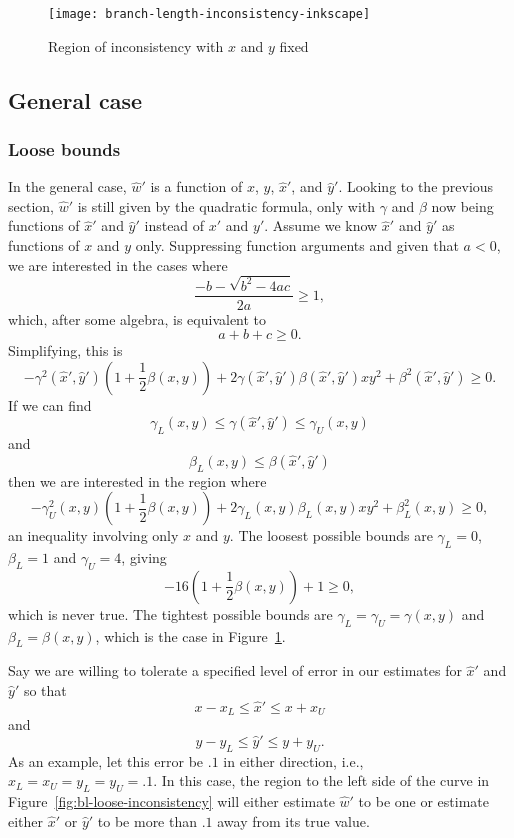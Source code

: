 \begin{figure}
\centering
\texttt{[image: branch-length-inconsistency-inkscape]}
\caption{Region of inconsistency with $x$ and $y$ fixed}
\label{fig:bl-inconsistency}
\end{figure}

\subsection{General case}

\subsubsection{Loose bounds}

In the general case, $\hat{w}'$ is a function of $x$, $y$, $\hat{x}'$, and $\hat{y}'$.
Looking to the previous section, $\hat{w}'$ is still given by the quadratic formula, only with $\gamma$ and $\beta$ now being functions of $\hat{x}'$ and $\hat{y}'$ instead of $x'$ and $y'$.
Assume we know $\hat{x}'$ and $\hat{y}'$ as functions of $x$ and $y$ only.
Suppressing function arguments and given that $a < 0$, we are interested in the cases where
$$
\frac{-b - \sqrt{b^2 - 4ac}}{2a} \ge 1,
$$
which, after some algebra, is equivalent to
$$
a + b + c \ge 0.
$$
Simplifying, this is
$$
-\gamma^2(\hat{x}', \hat{y}')(1 + \frac{1}{2}\beta(x, y)) + 2\gamma(\hat{x}', \hat{y}')\beta(\hat{x}', \hat{y}')xy^2 + \beta^2(\hat{x}', \hat{y}') \ge 0.
$$
If we can find
$$
\gamma_{L}(x, y) \le \gamma(\hat{x}', \hat{y}') \le \gamma_{U}(x, y)
$$
and
$$
\beta_{L}(x, y) \le \beta(\hat{x}', \hat{y}')
$$
then we are interested in the region where
$$
-\gamma_{U}^2(x, y)(1 + \frac{1}{2}\beta(x, y)) + 2\gamma_{L}(x, y)\beta_{L}(x, y)xy^2 + \beta_{L}^2(x, y) \ge 0,
$$
an inequality involving only $x$ and $y$.
The loosest possible bounds are $\gamma_{L} = 0$, $\beta_{L} = 1$ and $\gamma_{U} = 4$, giving
$$
-16(1 + \frac{1}{2}\beta(x, y)) + 1 \ge 0,
$$
which is never true.
The tightest possible bounds are $\gamma_{L} = \gamma_{U} = \gamma(x, y)$ and $\beta_{L} = \beta(x, y)$, which is the case in Figure~\ref{fig:bl-inconsistency}.

Say we are willing to tolerate a specified level of error in our estimates for $\hat{x}'$ and $\hat{y}'$ so that
$$
x-x_{L} \le \hat{x}' \le x+x_{U}
$$
and
$$
y-y_{L} \le \hat{y}' \le y+y_{U}.
$$
As an example, let this error be $.1$ in either direction, i.e., $x_{L}=x_{U}=y_{L}=y_{U}=.1$.
In this case, the region to the left side of the curve in Figure~\ref{fig:bl-loose-inconsistency} will either estimate $\hat{w}'$ to be one or estimate either $\hat{x}'$ or $\hat{y}'$ to be more than $.1$ away from its true value.

